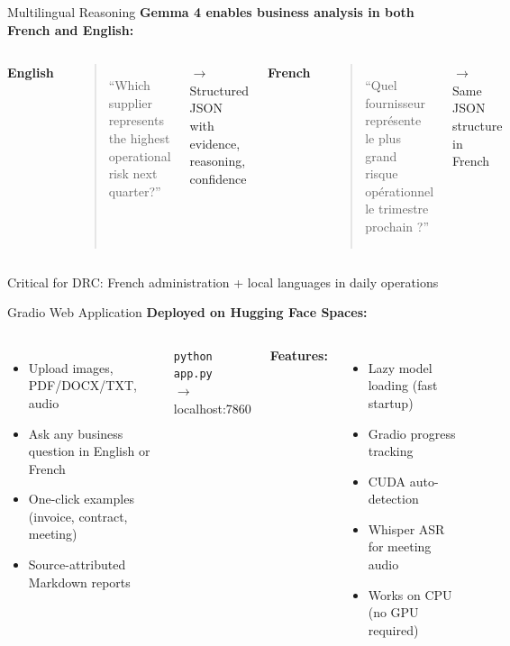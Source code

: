 \documentclass[aspectratio=169]{beamer}
\begin{document}
\begin{frame}{Multilingual Reasoning}
  \textbf{Gemma 4 enables business analysis in both French and English:}
  \vspace{0.5em}
  \begin{columns}[T]
    \textbf{English}
    \begin{quote}
      ``Which supplier represents the highest operational risk next quarter?''
    \end{quote}
    $\rightarrow$ Structured JSON with evidence, reasoning, confidence

    \textbf{French}
    \begin{quote}
      ``Quel fournisseur représente le plus grand risque opérationnel le trimestre prochain ?''
    \end{quote}
    $\rightarrow$ Same JSON structure in French
  \end{columns}
  \vspace{0.5em}
  \alert{Critical for DRC:} French administration + local languages in daily operations
\end{frame}

\begin{frame}{Gradio Web Application}
  \centering
  \textbf{Deployed on Hugging Face Spaces:}
  \vspace{0.5em}
  \begin{columns}[T]
    \begin{itemize}
      \item Upload images, PDF/DOCX/TXT, audio
      \item Ask any business question in English or French
      \item One-click examples (invoice, contract, meeting)
      \item Source-attributed Markdown reports
    \end{itemize}
    \vspace{0.5em}
    \texttt{python app.py} \\
    $\rightarrow$ localhost:7860

    \textbf{Features:}
    \begin{itemize}
      \item Lazy model loading (fast startup)
      \item Gradio progress tracking
      \item CUDA auto-detection
      \item Whisper ASR for meeting audio
      \item Works on CPU (no GPU required)
    \end{itemize}
  \end{columns}
\end{frame}
\end{document}
